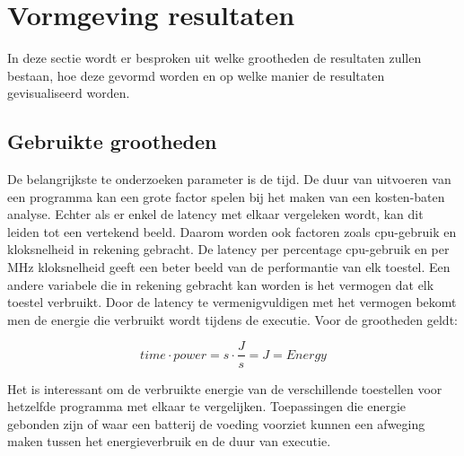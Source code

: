 \section{Vormgeving resultaten}
In deze sectie wordt er besproken uit welke grootheden de resultaten zullen bestaan, hoe deze gevormd worden en op welke manier de resultaten gevisualiseerd worden. 

	\subsection{Gebruikte grootheden} \label{subsec:gebruiktegrootheden}
	De belangrijkste te onderzoeken parameter is de tijd. De duur van uitvoeren van een programma kan een grote factor spelen bij het maken van een kosten-baten analyse. Echter als er enkel de latency met elkaar vergeleken wordt, kan dit leiden tot een vertekend beeld. Daarom worden ook factoren zoals \gls{cpu}-gebruik en kloksnelheid in rekening gebracht. De latency per percentage \gls{cpu}-gebruik en per MHz kloksnelheid geeft een beter beeld van de performantie van elk toestel. Een andere variabele die in rekening gebracht kan worden is het vermogen dat elk toestel verbruikt. Door de latency te vermenigvuldigen met het vermogen bekomt men de energie die verbruikt wordt tijdens de executie. Voor de grootheden geldt:
	
	\begin{equation}\label{eq:power}
		time \cdot power = s \cdot \frac{J}{s} = J = Energy	
	\end{equation}
	
	Het is interessant om de verbruikte energie van de verschillende toestellen voor hetzelfde programma met elkaar te vergelijken. Toepassingen die energie gebonden zijn of waar een batterij de voeding voorziet kunnen een afweging maken tussen het energieverbruik en de duur van executie.	\\

